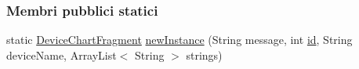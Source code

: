 \subsubsection*{Membri pubblici statici}
\begin{DoxyCompactItemize}
\item 
static \hyperlink{classit_1_1unibo_1_1torsello_1_1bluetoothpositioning_1_1fragment_1_1DeviceChartFragment}{Device\+Chart\+Fragment} \hyperlink{classit_1_1unibo_1_1torsello_1_1bluetoothpositioning_1_1fragment_1_1DeviceChartFragment_a16fb051f584eb5fd324e25ce67cc6730_a16fb051f584eb5fd324e25ce67cc6730}{new\+Instance} (String message, int \hyperlink{classit_1_1unibo_1_1torsello_1_1bluetoothpositioning_1_1fragment_1_1DeviceChartFragment_a93b0dbe70e24a27e96f52c5135006564_a93b0dbe70e24a27e96f52c5135006564}{id}, String device\+Name, Array\+List$<$ String $>$ strings)
\end{DoxyCompactItemize}

